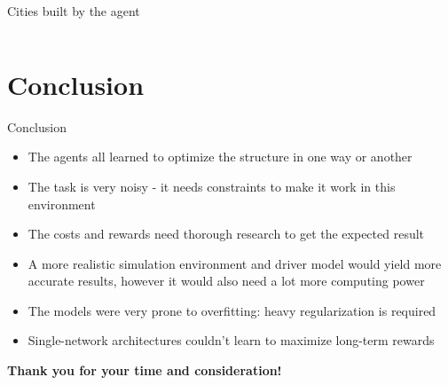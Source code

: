\documentclass[english, aspectratio=169]{beamer}
\makeatletter
\let\origtableofcontents=\tableofcontents
\def\tableofcontents{\@ifnextchar[{\origtableofcontents}{\gobbletableofcontents}}
\def\gobbletableofcontents#1{\origtableofcontents}
\makeatother
\begin{document}
\begin{frame}{Cities built by the agent}
\begin{columns}[T]
\begin{column}{0.5\textwidth}
\begin{itemize}
\begin{small}
		
		
	\end{small}
	\end{itemize}
\end{column}

\end{columns}
\end{frame}


\section{Conclusion}

\begin{frame}
	\tableofcontents[currentsection]
\end{frame}


\begin{frame}{Conclusion}
	\begin{itemize}
		\item The agents all learned to optimize the structure in one way or another
		\item The task is very noisy - it needs constraints to make it work in this environment
		\item The costs and rewards need thorough research to get the expected result
		\item A more realistic simulation environment and driver model would yield more accurate results, however it would also need a lot more computing power
		\item The models were very prone to overfitting: heavy regularization is required
		\item Single-network architectures couldn't learn to maximize long-term rewards
	\end{itemize}
\end{frame}


\begin{frame}
	\begin{center}
	\begin{huge}
		\textbf{Thank you for your time and consideration!}
	\end{huge}	
	\end{center}

\end{frame}
\end{document}
